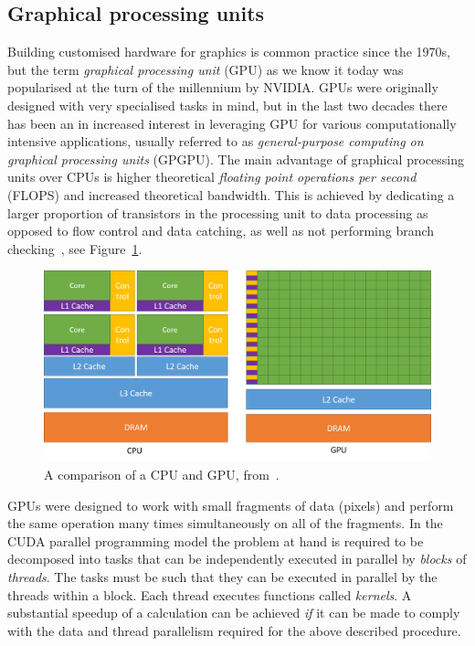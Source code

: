 \documentclass[final,3p,times,twocolumn]{elsarticle}
\begin{document}
		
	\subsection{Graphical processing units}
	Building customised hardware for graphics is common practice since the 1970s, but the term \emph{graphical processing unit} (GPU) as we know it today was popularised at the turn of the millennium by NVIDIA. GPUs were originally designed with very specialised tasks in mind, but in the last two decades there has been an in increased interest in leveraging GPU for various computationally intensive applications, usually referred to as \emph{general-purpose computing on graphical processing units} (GPGPU). The main advantage of graphical processing units over CPUs is higher theoretical \emph{floating point operations per second} (FLOPS) and increased theoretical bandwidth. This is achieved by dedicating a larger proportion of transistors in the processing unit to data processing as opposed to flow control and data catching, as well as not performing branch checking~\cite{cuda}, see Figure~\ref{fig:cuda-gpu}.
	\begin{figure}[h]
		\centering
		\includegraphics[width=\linewidth]{../diagrams/cuda-gpu}
		\caption{A comparison of a CPU and GPU, from~\cite{cuda}.}
		\label{fig:cuda-gpu}
	\end{figure}
	GPUs were designed to work with small fragments of data (pixels) and perform the same operation many times simultaneously on all of the fragments. In the CUDA parallel programming model the problem at hand is required to be decomposed into tasks that can be independently executed in parallel by \emph{blocks} of \emph{threads}. The tasks must be such that they can be executed in parallel by the threads within a block. Each thread executes functions called \emph{kernels}. A substantial speedup of a calculation can be achieved \emph{if} it can be made to comply with the data and thread parallelism required for the above described procedure. 
	
\end{document}
